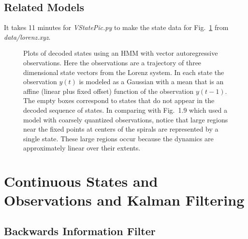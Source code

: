 \documentclass[prelim,showlabels]{book}
\newcommand{\ti}[2]{{#1}{(#2)}}                  %
\newcommand{\plotsize}{\small}
\begin{document}
\section{Related Models}
\label{sec:related}
It takes 11 minutes for \emph{VStatePic.py} to make the state data for
Fig.~\ref{fig:VARGstates} from \emph{data/lorenz.xyz}.
\begin{figure}[p]
  \centering{\plotsize%
    \texttt{[image: VARGstates.pdf]}
  }
  \caption[Vector autoregressive observation models.]%
  {Plots of decoded states using an HMM with vector autoregressive
    observations.  Here the observations are a trajectory of three
    dimensional state vectors from the Lorenz system.  In each state
    the observation $\ti{y}{t}$ is modeled as a Gaussian with a mean
    that is an affine (linear plus fixed offset) function of the
    observation $\ti{y}{t-1}$.  The empty boxes correspond to states
    that do not appear in the decoded sequence of states.  In
    comparing with Fig.~1.9 which used a model with
    coarsely quantized observations, notice that large regions near
    the fixed points at centers of the spirals are represented by a
    single state.  These large regions occur because the dynamics are
    approximately linear over their extents.}
  \label{fig:VARGstates}
\end{figure}

\chapter[Continuous States and Observations]{Continuous States and
  Observations and Kalman Filtering}
 \label{chap:continuous}
 
\section{Backwards Information Filter}
\label{sec:BackwardsInformation}
\end{document}
